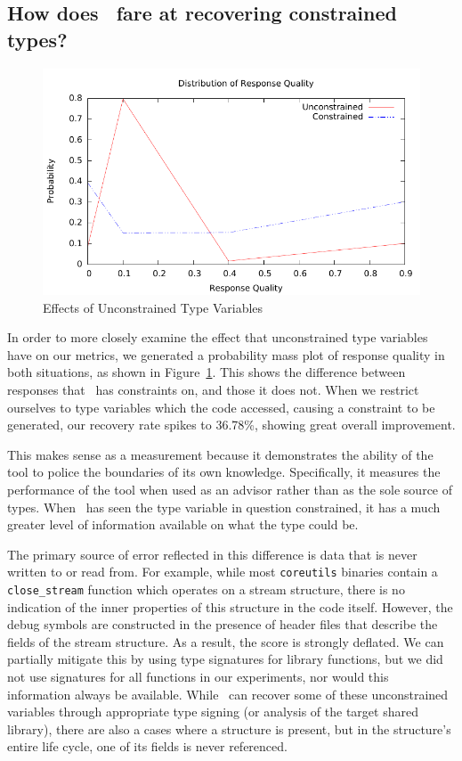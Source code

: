 \subsection{How does \bitr\ fare at recovering constrained types?}
\begin{figure}
	\begin{center}
\includegraphics[scale=1.1]{bitr/quality.pdf}
	\end{center}
\caption{Effects of Unconstrained Type Variables}
\label{fig:unconst}
\end{figure}

In order to more closely examine the effect that unconstrained type variables have on our metrics, we generated a probability mass plot of response quality in both situations, as shown in Figure~\ref{fig:unconst}. This shows the
difference between responses that \bitr\ has constraints on, and those it does not.
When we restrict ourselves to type variables which the code accessed, causing a constraint to be generated, our recovery rate spikes to 36.78\%, showing great overall improvement.

This makes sense as a measurement because it demonstrates the ability of the tool to police the boundaries of its own knowledge. Specifically, it measures the performance of the tool when used as an advisor rather than as the sole source of types. When \bitr\ has seen the type variable in question constrained, it has a much greater level of information available on what the type could be.

The primary source of error reflected in this difference is data that is never written to or read from. For example, while most \texttt{coreutils} binaries contain a \texttt{close\_stream} function which operates on a stream structure, there is no indication of the inner properties of this structure in the code itself. However, the debug symbols are constructed in the presence of header files that describe the fields of the stream structure. As a result, the score is strongly deflated.
We can partially mitigate this by using type signatures for library functions, but we did not use signatures for all functions in our experiments, nor would this information always be available.
While \bitr\ can recover some of these unconstrained variables through appropriate type signing (or analysis of the target shared library), there are also a cases where a structure is present, but in the structure's entire life cycle, one of its fields is never referenced.

